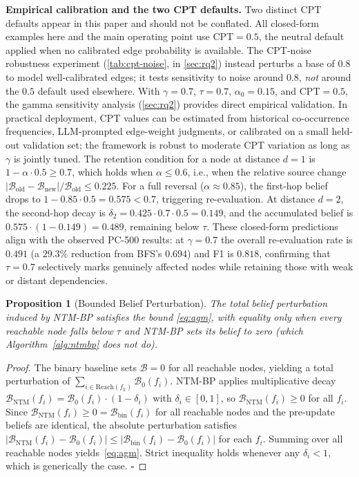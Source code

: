 \documentclass{article}
\newtheorem{proposition}[theorem]{Proposition}
\theoremstyle{definition}
\begin{document}
\textbf{Empirical calibration and the two CPT defaults.}  Two distinct CPT
defaults appear in this paper and should not be conflated.  All
closed-form examples here and the main operating point use
$\text{CPT}=0.5$, the neutral default applied when no calibrated edge
probability is available.  The CPT-noise robustness experiment
(\cref{tab:cpt-noise}, in \cref{sec:rq2}) instead perturbs a base of
$0.8$ to model well-calibrated edges; it tests sensitivity to noise
around $0.8$, \emph{not} around the $0.5$ default used elsewhere.  With
$\gamma=0.7$, $\tau=0.7$, $\alpha_0=0.15$, and $\text{CPT}=0.5$, the
gamma sensitivity analysis (\cref{sec:rq2}) provides direct empirical
validation.  In practical deployment, CPT values can be estimated from
historical co-occurrence frequencies, LLM-prompted edge-weight
judgments, or calibrated on a small held-out validation set; the
framework is robust to moderate CPT variation as long as $\gamma$ is
jointly tuned.  The retention condition for a node at distance $d=1$ is
$1-\alpha\cdot0.5\geq0.7$, which holds when $\alpha\leq0.6$, i.e., when
the relative source change
$|\mathcal{B}_{\text{old}}-\mathcal{B}_{\text{new}}|/\mathcal{B}_{\text{old}}
\leq0.225$.  For a
full reversal ($\alpha\approx0.85$), the first-hop belief drops to
$1-0.85\cdot0.5=0.575<0.7$, triggering re-evaluation.  At distance
$d=2$, the second-hop decay is $\delta_2=0.425\cdot0.7\cdot0.5=0.149$,
and the accumulated belief is $0.575\cdot(1-0.149)=0.489$, remaining
below $\tau$.  These closed-form predictions align with the observed
PC-500 results: at $\gamma=0.7$ the overall re-evaluation rate is $0.491$
(a $29.3\%$ reduction from BFS's $0.694$) and F1 is $0.818$, confirming
that $\tau=0.7$ selectively marks genuinely affected nodes while
retaining those with weak or distant dependencies.

\begin{proposition}[Bounded Belief Perturbation]
\label{thm:agm}
The total belief perturbation induced by NTM-BP satisfies the bound
\eqref{eq:agm}, with equality only when every reachable node falls below
$\tau$ \emph{and} NTM-BP sets its belief to zero (which
Algorithm~\ref{alg:ntmbp} does not do).
\end{proposition}
\begin{proof}
The binary baseline sets $\mathcal{B}=0$ for all reachable nodes, yielding
a total perturbation of $\sum_{i\in\text{Reach}(f_k)}\mathcal{B}_0(f_i)$.
NTM-BP applies multiplicative decay
$\mathcal{B}_{\text{NTM}}(f_i)=\mathcal{B}_0(f_i)\cdot(1-\delta_i)$ with
$\delta_i\in[0,1]$, so $\mathcal{B}_{\text{NTM}}(f_i)\geq0$ for all $f_i$.
Since $\mathcal{B}_{\text{NTM}}(f_i)\geq0=\mathcal{B}_{\text{bin}}(f_i)$
for all reachable nodes and the pre-update beliefs are identical, the
absolute perturbation satisfies
$|\mathcal{B}_{\text{NTM}}(f_i)-\mathcal{B}_0(f_i)|\leq|\mathcal{B}_{\text{bin}}(f_i)-\mathcal{B}_0(f_i)|$
for each $f_i$.  Summing over all reachable nodes yields~\eqref{eq:agm}.
Strict inequality holds whenever any $\delta_i<1$, which is generically
the case.
\hfill$\square$
\end{proof}
\end{document}

